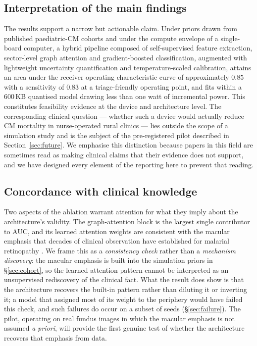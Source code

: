 \documentclass[twocolumn,10pt]{article}
\begin{document}
\subsection{Interpretation of the main findings}
The results support a narrow but actionable claim. Under priors
drawn from published paediatric-CM cohorts and under the compute
envelope of a single-board computer, a hybrid pipeline composed
of self-supervised feature extraction, sector-level graph
attention and gradient-boosted classification, augmented with
lightweight uncertainty quantification and temperature-scaled
calibration, attains an area under the receiver operating
characteristic curve of approximately $0.85$ with a sensitivity of
$0.83$ at a triage-friendly operating point, and fits within a
$600$\,KB quantised model drawing less than one watt of
incremental power. This constitutes feasibility evidence at the
device and architecture level. The corresponding clinical
question --- whether such a device would actually reduce CM
mortality in nurse-operated rural clinics --- lies outside the
scope of a simulation study and is the subject of the pre-registered
pilot described in Section~\ref{sec:future}. We emphasise this
distinction because papers in this field are sometimes read as
making clinical claims that their evidence does not support, and
we have designed every element of the reporting here to prevent
that reading.

\subsection{Concordance with clinical knowledge}
Two aspects of the ablation warrant attention for what they imply
about the architecture's validity. The graph-attention block is
the largest single contributor to AUC, and its learned attention
weights are consistent with the macular emphasis that decades of
clinical observation have established for malarial retinopathy
\cite{Beare2006,Beare2009,BeareArch2004}. We frame this as a
\emph{consistency check} rather than a \emph{mechanism discovery}:
the macular emphasis is built into the simulation priors in
\S\ref{sec:cohort}, so the learned attention pattern cannot be
interpreted as an unsupervised rediscovery of the clinical fact.
What the result does show is that the architecture recovers the
built-in pattern rather than diluting it or inverting it; a model
that assigned most of its weight to the periphery would have
failed this check, and such failures do occur on a subset of seeds
(\S\ref{sec:failure}). The pilot, operating on real fundus images
in which the macular emphasis is not assumed \emph{a priori}, will
provide the first genuine test of whether the architecture
recovers that emphasis from data.
\end{document}
